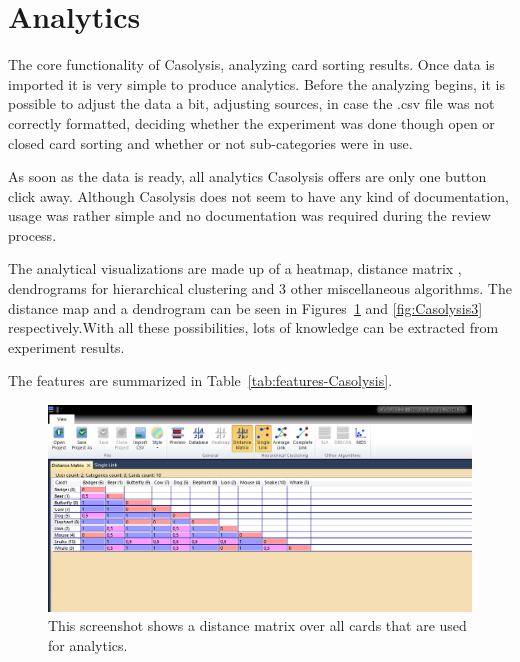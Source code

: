 \section{Analytics}
The core functionality of Casolysis, analyzing card sorting results.
Once data is imported it is very simple to produce analytics. Before
the analyzing begins, it is possible to adjust the data a bit, adjusting
sources, in case the .csv file was not correctly formatted, deciding
whether the experiment was done though open or closed card sorting and
whether or not sub-categories were in use.

As soon as the data is ready, all analytics Casolysis offers are only
one button click away. Although Casolysis does not seem to have any 
kind of documentation, usage was rather simple and no documentation was
required during the review process.

The analytical visualizations are made up of a heatmap, distance
matrix , dendrograms for hierarchical clustering and 3 other
miscellaneous  algorithms. The distance map and a dendrogram can be
seen in Figures~\ref{fig:Casolysis2} and \ref{fig:Casolysis3}
respectively.With all these possibilities, lots of knowledge can be
extracted from experiment results.

The features are summarized in Table~\ref{tab:features-Casolysis}.

\begin{figure}[tp] 
\centering
\includegraphics[keepaspectratio,width=\linewidth,height=\halfh]{images/casolysis-diagram-1.png}
\caption[Casolysis Distance Matrix] { This screenshot shows a distance
matrix over all cards that are used for analytics.
 }
\label{fig:Casolysis2}
\end{figure}

